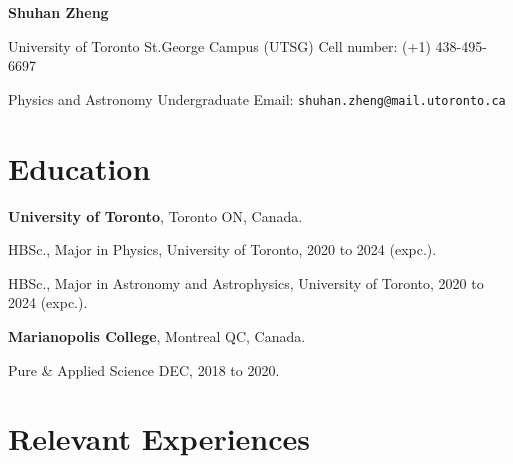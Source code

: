 \documentclass{article}
\newcommand{\cvsection}[1]{\section*{\rmfamily#1}}
\begin{document}
\begin{center}
    \Huge{
    \rmfamily
    \textbf{Shuhan Zheng}}
\end{center}
\vspace{20pt}    

\setlength{\parskip}{1pt}
\renewcommand{\arraystretch}{1.25}


\noindent University of Toronto St.George Campus (UTSG)  \hfill Cell number: (+1) 438-495-6697

\noindent Physics and Astronomy Undergraduate \hfill {Email: \texttt{shuhan.zheng@mail.utoronto.ca}}


\setlength{\parskip}{3pt}






\cvsection{Education}
\indent 

\textbf{University of Toronto}, Toronto ON, Canada.

\hspace{2em} HBSc., Major in Physics, University of Toronto, 2020 to 2024 (expc.).

\hspace{2em} HBSc., Major in Astronomy and Astrophysics, University of Toronto, 2020 to 2024 (expc.).

\textbf{Marianopolis College}, Montreal QC, Canada.

\hspace{2em} Pure \& Applied Science DEC, 2018 to 2020.

\cvsection{Relevant Experiences}
\end{document}
